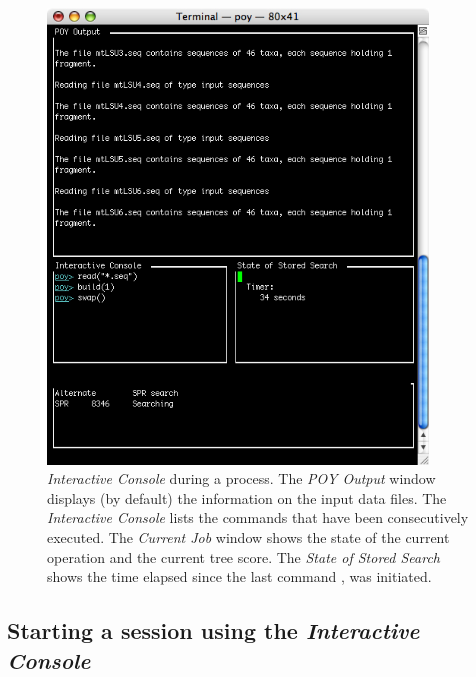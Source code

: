 {\begin{figure}[htbp]
\centering
\includegraphics[width=0.9\textwidth]{doc/figures/figprocess.jpg}
\caption{\poy \emph{Interactive Console} during a process. The \emph{POY Output} window displays (by default) the information 
on the input data files. The \emph{Interactive Console} lists the commands that have been consecutively executed. The 
\emph{Current Job} window shows the state of the current operation and the current tree score. The \emph{State of Stored Search} 
shows the time elapsed  since the last command , was initiated.}
\label{fig:figprocess}
\end{figure}

\subsection{Starting a \poy session using the \emph{Interactive Console}}

}
